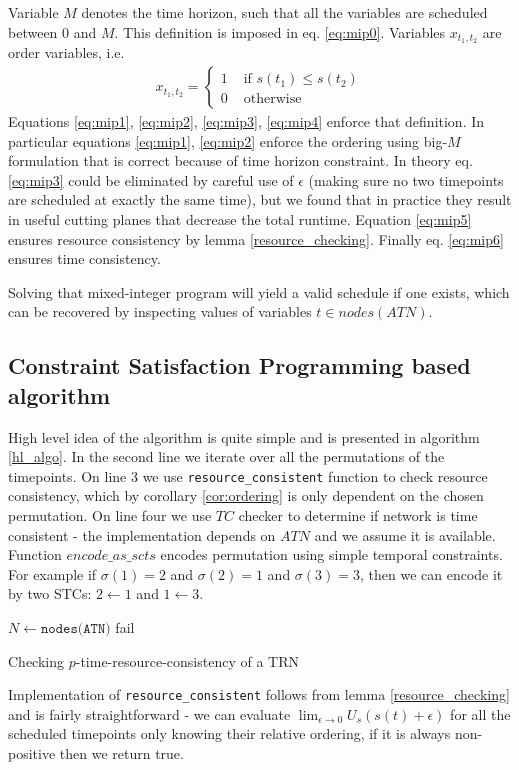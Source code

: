 Variable $M$ denotes the time horizon, such that all the variables are scheduled between $0$ and $M$. This definition is imposed in eq. \ref{eq:mip0}.
Variables $x_{t_1,t_2}$ are order variables, i.e.
\begin{align*}
x_{t_1, t_2} = \begin{cases}
1 &\text{ if }s(t_1) \leq s(t_2) \\
0 &\text{ otherwise}
\end{cases}
\end{align*}
Equations \ref{eq:mip1}, \ref{eq:mip2}, \ref{eq:mip3}, \ref{eq:mip4} enforce that definition. In particular equations \ref{eq:mip1}, \ref{eq:mip2} enforce the ordering using big-$M$ formulation that is correct because of time horizon constraint. In theory eq. \ref{eq:mip3} could be eliminated by careful use of $\epsilon$ (making sure no two timepoints are scheduled at exactly the same time), but we found that in practice they result in useful cutting planes that decrease the total runtime. Equation \ref{eq:mip5} ensures resource consistency by lemma \ref{resource_checking}. Finally eq. \ref{eq:mip6} ensures time consistency.

Solving that mixed-integer program will yield a valid schedule if one exists, which can be recovered by inspecting values of variables $t \in nodes(ATN)$.

\subsection{Constraint Satisfaction Programming based algorithm}
High level idea of the algorithm is quite simple and is presented in algorithm \ref{hl_algo}. In the second line we iterate over all the permutations of the timepoints. On line 3 we use \texttt{resource\_consistent} function to check resource consistency, which by corollary \ref{cor:ordering} is only dependent on the chosen permutation. On line four we use $TC$ checker to determine if network is time consistent - the implementation depends on $ATN$ and we assume it is available. Function $encode\_as\_scts$ encodes permutation using simple temporal constraints. For example if $\sigma(1) = 2$ and $\sigma(2) = 1$ and $\sigma(3) = 3$, then we can encode it by two STCs: $ 2 \leftarrow 1 $ and $1 \leftarrow 3$.

\begin{algorithm}[h]
    \label{hl_algo}
    $N \leftarrow \texttt{nodes(ATN)}$\;
    fail\;
    \caption{Checking $p$-time-resource-consistency of a TRN }
\end{algorithm}
Implementation of \texttt{resource\_consistent} follows from lemma \ref{resource_checking} and is fairly straightforward - we can evaluate $\lim_{\epsilon \to 0} U_s(s(t) + \epsilon)$ for all the scheduled timepoints only knowing their relative ordering, if it is always non-positive then we return true.

